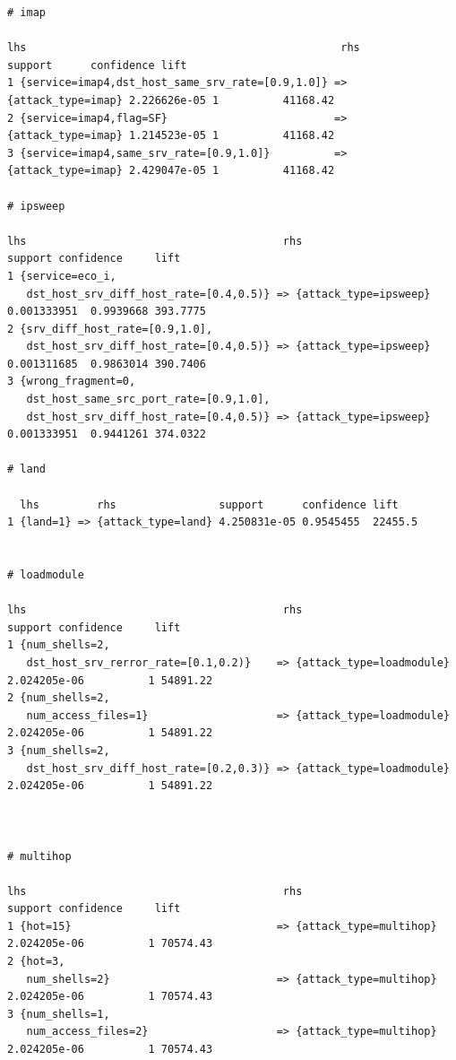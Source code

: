 \documentclass[11pt]{article}
\begin{document}
\begin{Verbatim}[fontsize=\tiny]
# imap

lhs                                                 rhs                support      confidence lift    
1 {service=imap4,dst_host_same_srv_rate=[0.9,1.0]} => {attack_type=imap} 2.226626e-05 1          41168.42
2 {service=imap4,flag=SF}                          => {attack_type=imap} 1.214523e-05 1          41168.42
3 {service=imap4,same_srv_rate=[0.9,1.0]}          => {attack_type=imap} 2.429047e-05 1          41168.42

# ipsweep

lhs                                        rhs                       support confidence     lift
1 {service=eco_i,                                                                                 
   dst_host_srv_diff_host_rate=[0.4,0.5)} => {attack_type=ipsweep} 0.001333951  0.9939668 393.7775
2 {srv_diff_host_rate=[0.9,1.0],                                                                  
   dst_host_srv_diff_host_rate=[0.4,0.5)} => {attack_type=ipsweep} 0.001311685  0.9863014 390.7406
3 {wrong_fragment=0,                                                                              
   dst_host_same_src_port_rate=[0.9,1.0],                                                         
   dst_host_srv_diff_host_rate=[0.4,0.5)} => {attack_type=ipsweep} 0.001333951  0.9441261 374.0322
   
# land
 
  lhs         rhs                support      confidence lift   
1 {land=1} => {attack_type=land} 4.250831e-05 0.9545455  22455.5


# loadmodule

lhs                                        rhs                           support confidence     lift
1 {num_shells=2,                                                                                      
   dst_host_srv_rerror_rate=[0.1,0.2)}    => {attack_type=loadmodule} 2.024205e-06          1 54891.22
2 {num_shells=2,                                                                                      
   num_access_files=1}                    => {attack_type=loadmodule} 2.024205e-06          1 54891.22
3 {num_shells=2,                                                                                      
   dst_host_srv_diff_host_rate=[0.2,0.3)} => {attack_type=loadmodule} 2.024205e-06          1 54891.22



# multihop

lhs                                        rhs                         support confidence     lift
1 {hot=15}                                => {attack_type=multihop} 2.024205e-06          1 70574.43
2 {hot=3,                                                                                           
   num_shells=2}                          => {attack_type=multihop} 2.024205e-06          1 70574.43
3 {num_shells=1,                                                                                    
   num_access_files=2}                    => {attack_type=multihop} 2.024205e-06          1 70574.43


\end{Verbatim}
\end{document}
